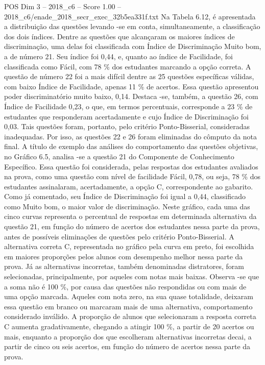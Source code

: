 \begin{textsample}{POS Dim 3 – 2018\_c6 – Score 1.00 – 2018\_c6/enade\_2018\_secr\_exec\_32b5ea331f.txt}
Na Tabela 6.12, é apresentada a distribuição das questões levando -se em conta, simultaneamente, a classificação dos dois índices.
Dentre as questões que alcançaram os maiores índices de discriminação, uma delas foi classificada com Índice de Discriminação Muito bom, a de número 21.
Seu índice foi 0,44, e, quanto ao índice de Facilidade, foi classificada como Fácil, com 78 \% dos estudantes marcando a opção correta.
A questão de número 22 foi a mais difícil dentre as 25 questões específicas válidas, com baixo Índice de Facilidade, apenas 11 \% de acertos.
Essa questão apresentou poder discriminatório muito baixo, 0,14.
Destaca -se, também, a questão 26, com Índice de Facilidade 0,23, o que, em termos percentuais, corresponde a 23 \% de estudantes que responderam acertadamente e cujo Índice de Discriminação foi 0,03.
Tais questões foram, portanto, pelo critério Ponto-Bisserial, consideradas inadequadas.
Por isso, as questões 22 e 26 foram eliminadas do cômputo da nota final.
A título de exemplo das análises do comportamento das questões objetivas, no Gráfico 6.5, analisa -se a questão 21 do Componente de Conhecimento Específico.
Essa questão foi considerada, pelas respostas dos estudantes avaliados na prova, como uma questão com nível de facilidade Fácil, 0,78, ou seja, 78 \% dos estudantes assinalaram, acertadamente, a opção C, correspondente ao gabarito.
Como já comentado, seu Índice de Discriminação foi igual a 0,44, classificado como Muito bom, o maior valor de discriminação.
Neste gráfico, cada uma das cinco curvas representa o percentual de respostas em determinada alternativa da questão 21, em função do número de acertos dos estudantes nessa parte da prova, antes de possíveis eliminações de questões pelo critério Ponto-Bisserial.
A alternativa correta C, representada no gráfico pela curva em preto, foi escolhida em maiores proporções pelos alunos com desempenho melhor nessa parte da prova.
Já as alternativas incorretas, também denominadas distratores, foram selecionadas, principalmente, por aqueles com notas mais baixas.
Observa -se que a soma não é 100 \%, por causa das questões não respondidas ou com mais de uma opção marcada.
Aqueles com nota zero, na sua quase totalidade, deixaram essa questão em branco ou marcaram mais de uma alternativa, comportamento considerado inválido.
A proporção de alunos que selecionaram a resposta correta C aumenta gradativamente, chegando a atingir 100 \%, a partir de 20 acertos ou mais, enquanto a proporção dos que escolheram alternativas incorretas decai, a partir de cinco ou seis acertos, em função do número de acertos nessa parte da prova.

\end{textsample}

